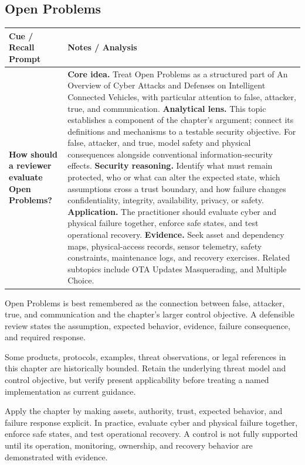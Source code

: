 \documentclass[11pt]{article}
\newcommand{\CornellHeader}{%
\rowcolor{Navy}\color{white}\bfseries Cue / Recall Prompt & \color{white}\bfseries Notes / Analysis\\\hline}
\newcommand{\CornellRow}[2]{%
\cellcolor{CueGray}\RaggedRight\textbf{#1} & \RaggedRight #2\\\hline}
\begin{document}
\subsection*{Open Problems}
\begin{longtable}{>{\RaggedRight\arraybackslash}p{}|>{\RaggedRight\arraybackslash}p{}}
\CornellHeader
\CornellRow{How should a reviewer evaluate Open Problems?}{\textbf{Core idea.} Treat Open Problems as a structured part of An Overview of Cyber Attacks and Defenses on Intelligent Connected Vehicles, with particular attention to false, attacker, true, and communication. \textbf{Analytical lens.} This topic establishes a component of the chapter's argument; connect its definitions and mechanisms to a testable security objective. For false, attacker, and true, model safety and physical consequences alongside conventional information-security effects. \textbf{Security reasoning.} Identify what must remain protected, who or what can alter the expected state, which assumptions cross a trust boundary, and how failure changes confidentiality, integrity, availability, privacy, or safety. \textbf{Application.} The practitioner should evaluate cyber and physical failure together, enforce safe states, and test operational recovery. \textbf{Evidence.} Seek asset and dependency maps, physical-access records, sensor telemetry, safety constraints, maintenance logs, and recovery exercises. Related subtopics include OTA Updates Masquerading, and Multiple Choice.}
\end{longtable}
\begin{topicsummary}
Open Problems is best remembered as the connection between false, attacker, true, and communication and the chapter's larger control objective. A defensible review states the assumption, expected behavior, evidence, failure consequence, and required response.
\end{topicsummary}
\begin{historybox}
Some products, protocols, examples, threat observations, or legal references in this chapter are historically bounded. Retain the underlying threat model and control objective, but verify present applicability before treating a named implementation as current guidance.
\end{historybox}
\begin{defensebox}
Apply the chapter by making assets, authority, trust, expected behavior, and failure response explicit. In practice, evaluate cyber and physical failure together, enforce safe states, and test operational recovery. A control is not fully supported until its operation, monitoring, ownership, and recovery behavior are demonstrated with evidence.
\end{defensebox}
\end{document}
